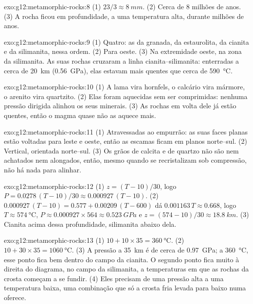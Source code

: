 \begin{solution}{exo:g12:metamorphic-rocks:8}
(1) $23/3 \approx \qty{8}{mm}$. (2) Cerca de 8 milhões de anos. (3) A rocha
ficou em profundidade, a uma temperatura alta, durante milhões de anos.
\end{solution}

\begin{solution}{exo:g12:metamorphic-rocks:9}
(1) Quatro: as  da granada, da estaurolita, da cianita e da
silimanita, nessa ordem. (2) Para oeste. (3) Na extremidade oeste, na zona
da silimanita. As suas rochas cruzaram a linha cianita--silimanita:
enterradas a cerca de \qty{20}{km} (\qty{0.56}{GPa}), elas estavam mais
quentes que cerca de \qty{590}{\celsius}.
\end{solution}

\begin{solution}{exo:g12:metamorphic-rocks:10}
(1) A lama vira hornfels, o calcário vira mármore, o arenito vira
quartzito. (2) Elas foram aquecidas sem ser comprimidas: nenhuma pressão
dirigida alinhou os seus minerais. (3) As rochas em volta dele já estão
quentes, então o magma quase não as aquece mais.
\end{solution}

\begin{solution}{exo:g12:metamorphic-rocks:11}
(1) Atravessadas ao empurrão: as suas faces planas estão voltadas para leste
e oeste, então as escamas ficam em planos norte--sul. (2) Vertical, orientada
norte--sul. (3) Os grãos de calcita e de quartzo não são nem achatados nem
alongados, então, mesmo quando se recristalizam sob compressão, não há nada
para alinhar.
\end{solution}

\begin{solution}{exo:g12:metamorphic-rocks:12}
(1) $z = (T - 10)/30$, logo $P = 0.0278\,(T - 10)/30 \approx
0.000927\,(T - 10)$. (2) $0.000927\,(T - 10) = 0.577 + 0.00209\,(T - 600)$
dá $0.001163\,T \approx 0.668$, logo $T \approx \qty{574}{\celsius}$, $P
\approx 0.000927 \times 564 \approx \qty{0.523}{GPa}$ e $z = (574 - 10)/30
\approx \qty{18.8}{km}$. (3) Cianita acima dessa profundidade, silimanita
abaixo dela.
\end{solution}

\begin{solution}{exo:g12:metamorphic-rocks:13}
(1) $10 + 10 \times 35 = \qty{360}{\celsius}$. (2) $10 + 30 \times 35 =
\qty{1060}{\celsius}$. (3) A pressão a \qty{35}{km} é de cerca de
\qty{0.97}{GPa}; a \qty{360}{\celsius}, esse ponto fica bem dentro do
campo da cianita. O segundo ponto fica muito à direita do diagrama, no
campo da silimanita, a temperaturas em que as rochas da crosta começam a se
fundir. (4) Eles precisam de uma pressão alta a uma temperatura baixa, uma
combinação que só a crosta fria levada para baixo numa 
oferece.
\end{solution}

